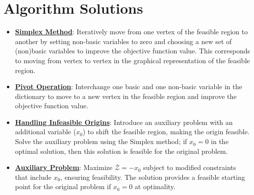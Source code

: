 \documentclass{article}%
\begin{document}
\section{Algorithm Solutions}%
\label{sec:AlgorithmSolutions}%
\begin{itemize}[[leftmargin=*]]%
\item \href{https://www.math.purdue.edu/~yipn/421/2024-08-27-ExSimplex.pdf#page=6}{\textbf{Simplex Method}}: Iteratively move from one vertex of the feasible region to another by setting non-basic variables to zero and choosing a new set of (non)basic variables to improve the objective function value. This corresponds to moving from vertex to vertex in the graphical representation of the feasible region.%
\item \href{https://www.math.purdue.edu/~yipn/421/2024-08-27-ExSimplex.pdf#page=9}{\textbf{Pivot Operation}}: Interchange one basic and one non-basic variable in the dictionary to move to a new vertex in the feasible region and improve the objective function value.%
\item \href{https://www.math.purdue.edu/~yipn/421/2024-08-27-ExSimplex.pdf#page=30}{\textbf{Handling Infeasible Origins}}: Introduce an auxiliary problem with an additional variable ($x_0$) to shift the feasible region, making the origin feasible. Solve the auxiliary problem using the Simplex method; if $x_0 = 0$ in the optimal solution, then this solution is feasible for the original problem.%
\item \href{https://www.math.purdue.edu/~yipn/421/2024-08-27-ExSimplex.pdf#page=32}{\textbf{Auxiliary Problem}}: Maximize $\overline{\mathcal{Z}} = -x_0$ subject to modified constraints that include $x_0$, ensuring feasibility. The solution provides a feasible starting point for the original problem if $x_0 = 0$ at optimality.%
\end{itemize}

%
\end{document}
